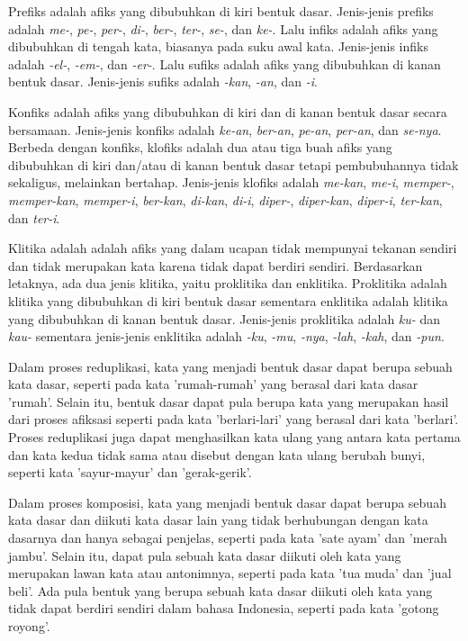 Prefiks adalah afiks yang dibubuhkan di kiri bentuk dasar. Jenis-jenis prefiks adalah \textit{me-}, \textit{pe-}, \textit{per-}, \textit{di-}, \textit{ber-}, \textit{ter-}, \textit{se-}, dan \textit{ke-}. Lalu infiks adalah afiks yang dibubuhkan di tengah kata, biasanya pada suku awal kata. Jenis-jenis infiks adalah \textit{-el-}, \textit{-em-}, dan \textit{-er-}. Lalu sufiks adalah afiks yang dibubuhkan di kanan bentuk dasar. Jenis-jenis sufiks adalah \textit{-kan}, \textit{-an}, dan \textit{-i}.

Konfiks adalah afiks yang dibubuhkan di kiri dan di kanan bentuk dasar secara bersamaan. Jenis-jenis konfiks adalah \textit{ke-an}, \textit{ber-an}, \textit{pe-an}, \textit{per-an}, dan \textit{se-nya}. Berbeda dengan konfiks, klofiks adalah dua atau tiga buah afiks yang dibubuhkan di kiri dan/atau di kanan bentuk dasar tetapi pembubuhannya tidak sekaligus, melainkan bertahap. Jenis-jenis klofiks adalah \textit{me-kan}, \textit{me-i}, \textit{memper-}, \textit{memper-kan}, \textit{memper-i}, \textit{ber-kan}, \textit{di-kan}, \textit{di-i}, \textit{diper-}, \textit{diper-kan}, \textit{diper-i}, \textit{ter-kan}, dan \textit{ter-i}.

Klitika adalah adalah afiks yang dalam ucapan tidak mempunyai tekanan sendiri dan tidak merupakan kata karena tidak dapat berdiri sendiri. Berdasarkan letaknya, ada dua jenis klitika, yaitu proklitika dan enklitika. Proklitika adalah klitika yang dibubuhkan di kiri bentuk dasar sementara enklitika adalah klitika yang dibubuhkan di kanan bentuk dasar. Jenis-jenis proklitika adalah \textit{ku-} dan \textit{kau-} sementara jenis-jenis enklitika adalah \textit{-ku}, \textit{-mu}, \textit{-nya}, \textit{-lah}, \textit{-kah}, dan \textit{-pun}.

Dalam proses reduplikasi, kata yang menjadi bentuk dasar dapat berupa sebuah kata dasar, seperti pada kata 'rumah-rumah' yang berasal dari kata dasar 'rumah'. Selain itu, bentuk dasar dapat pula berupa kata yang merupakan hasil dari proses afiksasi seperti pada kata 'berlari-lari' yang berasal dari kata 'berlari'. Proses reduplikasi juga dapat menghasilkan kata ulang yang antara kata pertama dan kata kedua tidak sama atau disebut dengan kata ulang berubah bunyi, seperti kata 'sayur-mayur' dan 'gerak-gerik'.

Dalam proses komposisi, kata yang menjadi bentuk dasar dapat berupa sebuah kata dasar dan diikuti kata dasar lain yang tidak berhubungan dengan kata dasarnya dan hanya sebagai penjelas, seperti pada kata 'sate ayam' dan 'merah jambu'. Selain itu, dapat pula sebuah kata dasar diikuti oleh kata yang merupakan lawan kata atau antonimnya, seperti pada kata 'tua muda' dan 'jual beli'. Ada pula bentuk yang berupa sebuah kata dasar diikuti oleh kata yang tidak dapat berdiri sendiri dalam bahasa Indonesia, seperti pada kata 'gotong royong'.


